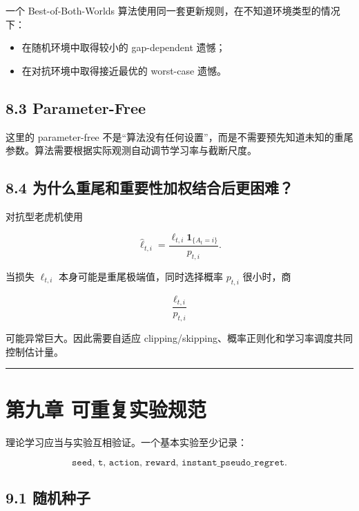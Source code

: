 \documentclass[
  11pt,
  a4paper,
]{ctexart}
\providecommand{\tightlist}{%
  \setlength{\itemsep}{0pt}\setlength{\parskip}{0pt}}
\begin{document}
一个 Best-of-Both-Worlds
算法使用同一套更新规则，在不知道环境类型的情况下：

\begin{itemize}
\tightlist
\item
  在随机环境中取得较小的 gap-dependent 遗憾；
\item
  在对抗环境中取得接近最优的 worst-case 遗憾。
\end{itemize}

\subsection{8.3 Parameter-Free}\label{parameter-free}

这里的 parameter-free
不是``算法没有任何设置''，而是不需要预先知道未知的重尾参数。算法需要根据实际观测自动调节学习率与截断尺度。

\subsection{8.4
为什么重尾和重要性加权结合后更困难？}\label{ux4e3aux4ec0ux4e48ux91cdux5c3eux548cux91cdux8981ux6027ux52a0ux6743ux7ed3ux5408ux540eux66f4ux56f0ux96be}

对抗型老虎机使用

\[
\widehat\ell_{t,i}
=\frac{\ell_{t,i}\mathbf1_{\{A_t=i\}}}{p_{t,i}}.
\]

当损失 \(\ell_{t,i}\) 本身可能是重尾极端值，同时选择概率 \(p_{t,i}\)
很小时，商

\[
\frac{\ell_{t,i}}{p_{t,i}}
\]

可能异常巨大。因此需要自适应
clipping/skipping、概率正则化和学习率调度共同控制估计量。




\begin{center}\rule{0.5\linewidth}{0.5pt}\end{center}

\section{第九章
可重复实验规范}\label{ux7b2cux4e5dux7ae0-ux53efux91cdux590dux5b9eux9a8cux89c4ux8303}

理论学习应当与实验互相验证。一个基本实验至少记录：

\[
\texttt{seed, t, action, reward, instant\_pseudo\_regret}.
\]

\subsection{9.1 随机种子}\label{ux968fux673aux79cdux5b50}
\end{document}
